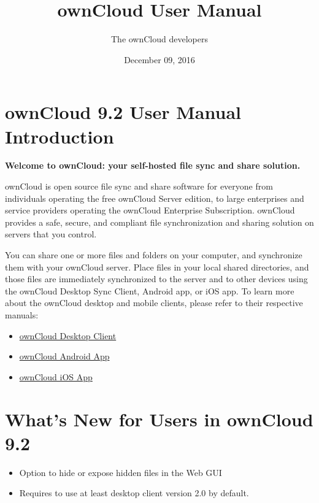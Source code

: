 \documentclass[letterpaper,10pt,english]{sphinxmanual}
\title{ownCloud User Manual}
\date{December 09, 2016}
\author{The ownCloud developers}
\begin{document}
\maketitle
\tableofcontents
{}\label{contents::doc}



\chapter{ownCloud 9.2 User Manual Introduction}
\label{index::doc}\label{index:table-of-contents}\label{index:owncloud-version-user-manual-introduction}\label{index:contents}\label{index:index}
\textbf{Welcome to ownCloud: your self-hosted file sync and share solution.}

ownCloud is open source file sync and share software for everyone from
individuals operating the free ownCloud Server edition, to large enterprises
and service providers operating the ownCloud Enterprise Subscription. ownCloud
provides a safe, secure, and compliant file synchronization and sharing
solution on servers that you control.

You can share one or more files and folders on your computer, and synchronize
them with your ownCloud server. Place files in your local shared directories,
and those files are immediately synchronized to the server and to other devices
using the ownCloud Desktop Sync Client, Android app, or iOS app. To learn more
about the ownCloud desktop and mobile clients, please refer to their respective
manuals:
\begin{itemize}
\item {} 
\href{https://doc.owncloud.org/desktop/2.1/}{ownCloud Desktop Client}

\item {} 
\href{https://doc.owncloud.org/android/}{ownCloud Android App}

\item {} 
\href{https://doc.owncloud.org/ios/}{ownCloud iOS App}

\end{itemize}


\chapter{What's New for Users in ownCloud 9.2}
\label{whats_new:what-s-new-for-users-in-owncloud-version}\label{whats_new::doc}\begin{itemize}
\item {} 
Option to hide or expose hidden files in the Web GUI

\item {} 
Requires to use at least desktop client version 2.0 by default.

\end{itemize}
\end{document}
